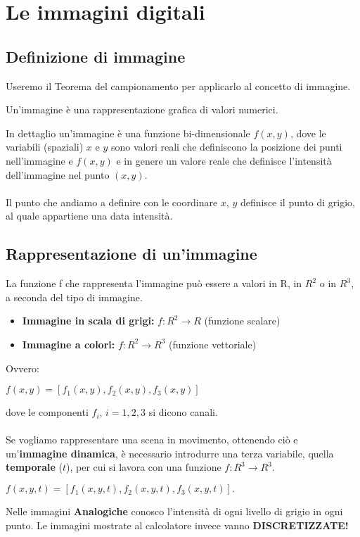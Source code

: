 \chapter{Le immagini digitali}
\section{Definizione di immagine}
Useremo il Teorema del campionamento per applicarlo al concetto di immagine.
\begin{definition}
    Un’immagine è una rappresentazione grafica di valori numerici.
\end{definition}
In dettaglio un’immagine è una funzione bi-dimensionale $f(x,y)$, dove le variabili (spaziali) $x$ e $y$ sono valori reali che definiscono la posizione dei punti nell’immagine e $f(x,y)$ e in genere un valore reale che definisce l’intensità dell’immagine nel punto $(x,y)$.
\\\\Il punto che andiamo a definire con le coordinare $x$, $y$ definisce il punto di grigio, al quale appartiene una data intensità.
\section{Rappresentazione di un’immagine}
La funzione f che rappresenta l’immagine può essere a valori in R,
in $R^2$ o in $R^3$, a seconda del tipo di immagine.
\begin{itemize}
    \item \textbf{Immagine in scala di grigi:} $f:R^2 \rightarrow R$ (funzione scalare)
    \item \textbf{Immagine a colori:} $f:R^2 \rightarrow R^3$ (funzione vettoriale)
\end{itemize}
Ovvero:
\begin{center}
    $f(x,y) = [f_1(x,y), f_2(x,y), f_3(x,y)]$
\end{center}
dove le componenti $f_i$, $i = 1,2,3$ si dicono canali.
\\\\Se vogliamo rappresentare una scena in movimento, ottenendo
ciò e un’\textbf{immagine dinamica}, è necessario introdurre una terza
variabile, quella \textbf{temporale} ($t$), per cui si lavora con una funzione
$f: R^3 \rightarrow R^3$.
\begin{center}
    $f(x,y,t) = [f_1(x,y,t), f_2(x ,y,t), f_3(x,y,t)].$
\end{center}
Nelle immagini \textbf{Analogiche} conosco l'intensità di ogni livello di grigio in ogni punto.
Le immagini mostrate al calcolatore invece vanno \textbf{DISCRETIZZATE!}
